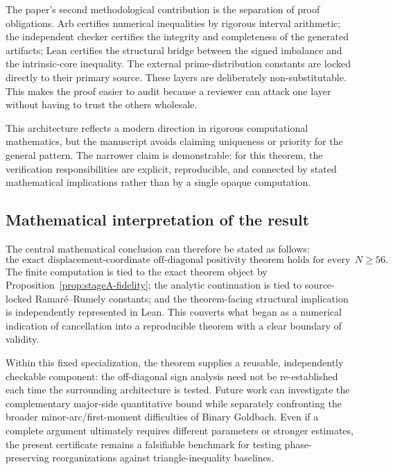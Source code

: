 \documentclass[11pt]{article}
\theoremstyle{definition}
\begin{document}
The paper's second methodological contribution is the separation of proof obligations. Arb certifies numerical inequalities by rigorous interval arithmetic; the independent checker certifies the integrity and completeness of the generated artifacts; Lean certifies the structural bridge between the signed imbalance and the intrinsic-core inequality. The external prime-distribution constants are locked directly to their primary source. These layers are deliberately non-substitutable. This makes the proof easier to audit because a reviewer can attack one layer without having to trust the others wholesale.

This architecture reflects a modern direction in rigorous computational mathematics, but the manuscript avoids claiming uniqueness or priority for the general pattern. The narrower claim is demonstrable: for this theorem, the verification responsibilities are explicit, reproducible, and connected by stated mathematical implications rather than by a single opaque computation.

\subsection{Mathematical interpretation of the result}

The central mathematical conclusion can therefore be stated as follows:
\[
\boxed{
\text{the exact displacement-coordinate off-diagonal positivity theorem holds for every even }N\ge56.
}
\]
The finite computation is tied to the exact theorem object by Proposition~\ref{prop:stageA-fidelity}; the analytic continuation is tied to source-locked Ramar\'{e}--Rumely constants; and the theorem-facing structural implication is independently represented in Lean. This converts what began as a numerical indication of cancellation into a reproducible theorem with a clear boundary of validity.

Within this fixed specialization, the theorem supplies a reusable, independently checkable component: the off-diagonal sign analysis need not be re-established each time the surrounding architecture is tested. Future work can investigate the complementary major-side quantitative bound while separately confronting the broader minor-arc/first-moment difficulties of Binary Goldbach. Even if a complete argument ultimately requires different parameters or stronger estimates, the present certificate remains a falsifiable benchmark for testing phase-preserving reorganizations against triangle-inequality baselines.
\end{document}
